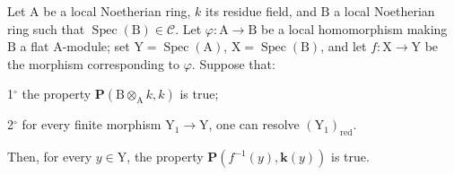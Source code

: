 \begin{proposition}[7.9.8]
\label{IV.7.9.8}
Let $\mathrm{A}$ be a local Noetherian ring, $k$ its residue field, and $\mathrm{B}$ a local Noetherian ring such that $\operatorname{Spec}(\mathrm{B})\in\mathcal{C}$. Let $\varphi:\mathrm{A}\to\mathrm{B}$ be a local homomorphism making $\mathrm{B}$ a flat $\mathrm{A}$-module; set $\mathrm{Y}=\operatorname{Spec}(\mathrm{A})$, $\mathrm{X}=\operatorname{Spec}(\mathrm{B})$, and let $f:\mathrm{X}\to\mathrm{Y}$ be the morphism corresponding to $\varphi$. Suppose that:

1${}^\circ$ the property $\boldsymbol{P}(\mathrm{B}\otimes_\mathrm{A} k,k)$ is true;

2${}^\circ$ for every finite morphism $\mathrm{Y}_1\to\mathrm{Y}$, one can resolve $(\mathrm{Y}_1)_{\mathrm{red}}$.

Then, for every $y\in\mathrm{Y}$, the property $\boldsymbol{P}(f^{-1}(y),\boldsymbol{k}(y))$ is true.
\end{proposition}

